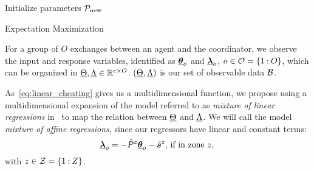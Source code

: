 \documentclass{ifacconf}  %
\begin{document}
\begin{algorithm2e}[h]
  \DontPrintSemicolon%
  Initialize parameters $\mathcal{P}_{\mathrm{new}}$\;
 \caption{Expectation Maximization}\label{alg:em}
\end{algorithm2e}

For a group of $O$ exchanges between an agent and the coordinator, we observe the input and response variables, identified as  ${\underline{\boldsymbol{\theta}}_{o}}$ and ${\underline{\boldsymbol{\lambda}}_{o}}$, ${o\in\mathcal{O}=\{1\mathbin{:} O\}}$, which can be organized in ${\underline{\Theta},\underline{\Lambda}\in\mathbb{R}^{c\times O}}$. ${(\underline{\Theta},\underline{\Lambda})}$ is our set of observable data $\mathcal{B}$.

As~\eqref{eq:linear_cheating} gives us a multidimensional \pwa{} function, we propose using a multidimensional expansion of the model referred to as \emph{mixture of linear regressions} in~\cite{FariaSoromenho2010} to map the relation between $\underline{\Theta}$ and $\underline{\Lambda}$. We will call the model \emph{mixture of affine regressions}, since our regressors have linear and constant terms:
\begin{equation}\label{eq:linear_cheating_random}
  {\underline{\boldsymbol{\lambda}}}_{o}=
    -\tilde{P}^{z}{\underline{\boldsymbol{\theta}}}_{o}-\tilde{\boldsymbol{s}}^{z}\text{, if in zone } z,\\
\end{equation}
with  ${z\in\mathcal{Z}=\{1\mathbin{:} Z\}}$.
\end{document}
